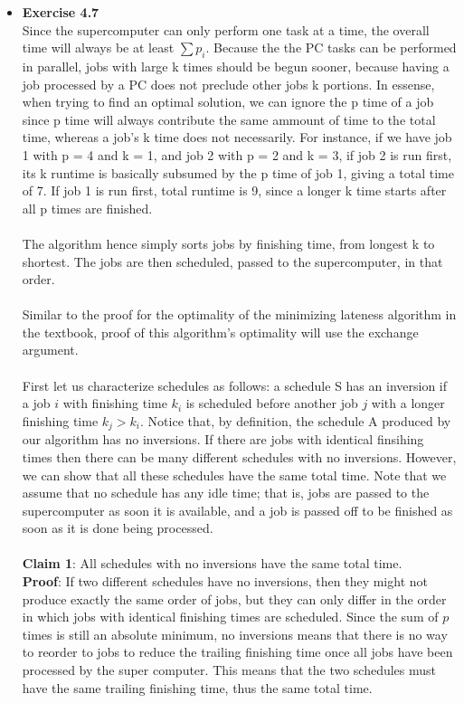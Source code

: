 \documentclass[a4paper]{article}
\begin{document}
\begin{itemize}
\item{\textbf{Exercise 4.7}} \\
Since the supercomputer can only perform one task at a time, the overall time will always be at least $\sum{p_i}$. Because the the PC tasks can be performed in parallel, jobs with large k times should be begun sooner, because having a job processed by a PC does not preclude other jobs k portions. In essense, when trying to find an optimal solution, we can ignore the p time of a job since p time will always contribute the same ammount of time to the total time, whereas a job's k time does not necessarily. For instance, if we have job 1 with p = 4 and k = 1, and job 2 with p = 2 and k = 3, if job 2 is run first, its k runtime is basically subsumed by the p time of job 1, giving a total time of 7. If job 1 is run first, total runtime is 9, since a longer k time starts after all p times are finished. \\
\\
The algorithm hence simply sorts jobs by finishing time, from longest k to shortest. The jobs are then scheduled, passed to the supercomputer, in that order. \\
\\
Similar to the proof for the optimality of the minimizing lateness algorithm in the textbook, proof of this algorithm's optimality will use the exchange argument. \\
\\
First let us characterize schedules as follows: a schedule S has an inversion if a job $i$ with finishing time $k_i$ is scheduled before another job $j$ with a longer finishing time $k_j > k_i$. Notice that, by definition, the
schedule A produced by our algorithm has no inversions. If there are jobs with identical finsihing times then there can be many different schedules with no inversions. However, we can show that all these schedules have the same
total time. Note that we assume that no schedule has any idle time; that is, jobs are passed to the supercomputer as soon it is available, and a job is passed off to be finished as soon as it is done being processed. \\
\\
\textbf{Claim 1}: All schedules with no inversions have the same total time. \\
\textbf{Proof}: If two different schedules have no inversions, then they might not produce exactly the same order of jobs, but they can only differ in the order in which jobs with identical finishing times are scheduled. Since the sum of $p$ times is still an absolute minimum, no inversions means that there is no way to reorder to jobs to reduce the trailing finishing time once all jobs have been processed by the super computer. This means that the two schedules must have the same trailing finishing time, thus the same total time. \\

\end{itemize}
\end{document}
